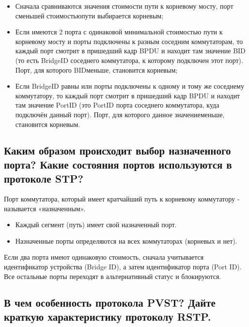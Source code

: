 \begin{itemize}
    \item Сначала сравниваются значения стоимости пути к корневому мосту,
    порт сменьшей стоимостьюпути выбирается корневым;
    \item Если имеются 2 порта с одинаковой минимальной стоимостью пути
    к корневому мосту и порты подключены к разным соседним
    коммутаторам, то каждый порт смотрит в пришедший кадр BPDU и
    находит там значение BID (то есть BridgeID соседнего коммутатора, к
    которому подключен этот порт). Порт, для которого BIDменьше,
    становится корневым;
    \item Если BridgeID равны или порты подключены к одному и тому же
    соседнему коммутатору, то каждый порт смотрит в пришедший кадр
    BPDU и находит там значение PortID (это PortID порта соседнего
    коммутатора, куда подключён данный порт). Порт, для которого
    данное значениеменьше, становится корневым.
\end{itemize}

\subsection{Каким образом происходит выбор назначенного порта? Какие
состояния портов используются в протоколе STP?}

Порт коммутатора, который имеет кратчайший путь к корневому
коммутатору - называется «назначенным».

\begin{itemize}
    \item Каждый сегмент (путь) имеет свой назначенный порт.
    \item Назначенные порты определяются на всех коммутаторах
    (корневых и нет).
\end{itemize}

Если два порта имеют одинаковую стоимость, сначала учитывается
идентификатор устройства (Bridge ID), а затем идентификатор порта (Port
ID).
Все остальные порты переходят в альтернативный статус и блокируются.

\subsection{В чем особенность протокола PVST? Дайте краткую характеристику
протоколу RSTP.}

